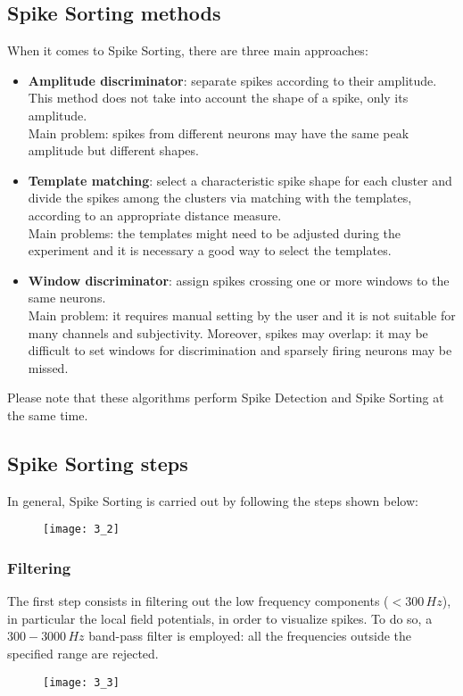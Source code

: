 \subsection{Spike Sorting methods}
When it comes to Spike Sorting, there are three main approaches:
\begin{itemize}
    \item \textbf{Amplitude discriminator}: separate spikes according to their amplitude. This method does not take into account the shape of a spike, only its amplitude.\\
    Main problem: spikes from different neurons may have the same peak amplitude but different shapes.
    \item \textbf{Template matching}: select a characteristic spike shape for each cluster and divide the spikes among the clusters via matching with the templates, according to an appropriate distance measure.\\
    Main problems: the templates might need to be adjusted during the experiment and it is necessary a good way to select the templates.
    \item \textbf{Window discriminator}: assign spikes crossing one or more windows to the same neurons.\\
    Main problem: it requires manual setting by the user and it is not suitable for many channels and subjectivity. Moreover, spikes may overlap: it may be difficult to set windows for discrimination and sparsely firing neurons may be missed.
\end{itemize}
Please note that these algorithms perform Spike Detection and Spike Sorting at the same time.\\
\subsection{Spike Sorting steps}
In general, Spike Sorting is carried out by following the steps shown below:
\begin{figure}[H]
    \texttt{[image: 3\_2]}
    \centering
\end{figure}
\subsubsection{Filtering}
The first step consists in filtering out the low frequency components (\(< 300 \,Hz\)), in particular the local field potentials, in order to visualize spikes. To do so, a \(300-3000 \,Hz\) band-pass filter is employed: all the frequencies outside the specified range are rejected.
\begin{figure}[H]
    \texttt{[image: 3\_3]}
    \centering
\end{figure}
